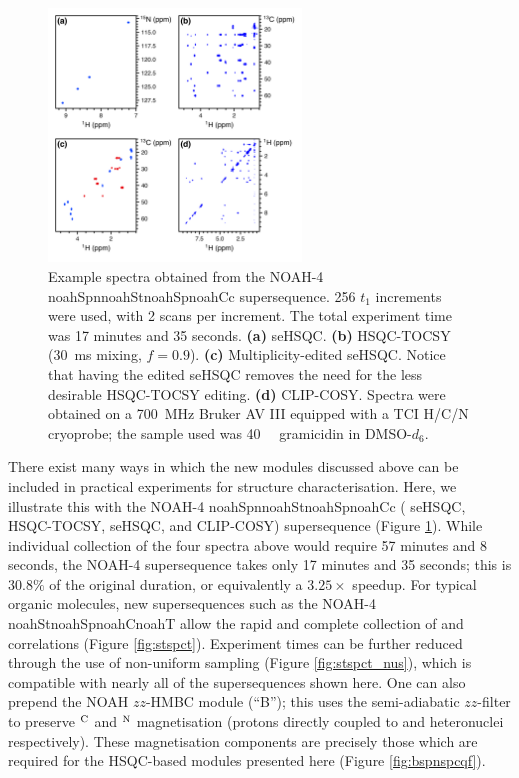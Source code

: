 \documentclass[11pt]{article}
\newcommand*{\noahfour}[4]{\csname noah#1\endcsname\csname noah#2\endcsname\csname noah#3\endcsname\csname noah#4\endcsname}
\newcommand*{\noahB}{B}
\newcommand*{\carbon}{\ce{^{13}C}}
\newcommand*{\nitrogen}{\ce{^{15}N}}
\newcommand*{\magn}[1]{\ce{^1H}$^{#1}$}
\newcommand*{\figref}[1]{Figure \ref{fig:#1}}
\newcommand*{\grami}{Spectra were obtained on a \SI{700}{\MHz} Bruker AV III equipped with a TCI H/C/N cryoprobe; the sample used was \SI{40}{\milli\molar} gramicidin in DMSO-$d_6$.}
\begin{document}


\begin{figure}
    \centering
    \includegraphics[width=0.6\textwidth]{spstspcc.png}
    \caption{
        Example spectra obtained from the NOAH-4 \noahfour{Spn}{St}{Sp}{Cc} supersequence.
        256 $t_1$ increments were used, with 2 scans per increment.
        The total experiment time was 17 minutes and 35 seconds.
        \textbf{(a)} \nitrogen{} seHSQC.
        \textbf{(b)} \carbon{} HSQC-TOCSY (\SI{30}{ms} mixing, $f = 0.9$).
        \textbf{(c)} Multiplicity-edited \carbon{} seHSQC. Notice that having the edited seHSQC removes the need for the less desirable HSQC-TOCSY editing.
        \textbf{(d)} CLIP-COSY.
        \grami{}
    }
    \label{fig:example_spec}
\end{figure}

There exist many ways in which the new modules discussed above can be included in practical experiments for structure characterisation.
Here, we illustrate this with the NOAH-4 \noahfour{Spn}{St}{Sp}{Cc} (\nitrogen{} seHSQC, \carbon{} HSQC-TOCSY, \carbon{} seHSQC, and CLIP-COSY) supersequence (\figref{example_spec}).
While individual collection of the four spectra above would require 57 minutes and 8 seconds, the NOAH-4 supersequence takes only 17 minutes and 35 seconds; this is $30.8\%$ of the original duration, or equivalently a $3.25\times$ speedup.
For typical organic molecules, new supersequences such as the NOAH-4 \noahfour{St}{Sp}{C}{T} allow the rapid and complete collection of  and  correlations (\figref{stspct}).
Experiment times can be further reduced through the use of non-uniform sampling (\figref{stspct_nus}), which is compatible with nearly all of the supersequences shown here.
One can also prepend the NOAH $zz$-HMBC module (``\noahB{}'');\autocite{Kupce2019JMR} this uses the semi-adiabatic $zz$-filter to preserve \magn{\ce{C}} and \magn{\ce{N}} magnetisation (protons directly coupled to \carbon{} and \nitrogen{} heteronuclei respectively).
These magnetisation components are precisely those which are required for the HSQC-based modules presented here (\figref{bspnspcqf}).
\end{document}
